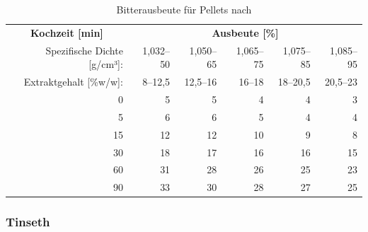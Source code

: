 \documentclass[a4paper,parskip=half]{scrartcl}
\begin{document}
\begin{table}[H]
\centering
\begin{tabular}{rrrrrr} 
\toprule
\multicolumn{1}{c}{\textbf{Kochzeit [min]}} & \multicolumn{5}{c}{\textbf{Ausbeute [\%]}}                                 \\
Spezifische Dichte [g/cm³]:                    & 1,032–50 & 1,050–65 & 1,065–75 & 1,075–85 & 1,085–95  \\
Extraktgehalt [\%w/w]:                    & 8–12,5 & 12,5–16 & 16–18 & 18–20,5 & 20,5–23  \\
\midrule
0                                            & 5        & 5        & 4                            & 4                            & 3                             \\
5                                            & 6        & 6        & 5                            & 4                            & 4                             \\
15                                           & 12       & 12       & 10                           & 9                            & 8                             \\
30                                           & 18       & 17       & 16                           & 16                           & 15                            \\
60                                           & 31       & 28       & 26                           & 25                           & 23                            \\
90                                           & 33       & 30       & 28                           & 27                           & 25                     \\
\bottomrule
\end{tabular}
\caption{Bitterausbeute für Pellets nach \citeauthor{Noonan1996} \parencite[215]{Noonan1996}}
\label{table:noonanutilpellets}
\end{table}

\subsubsection*{Tinseth}
\end{document}
